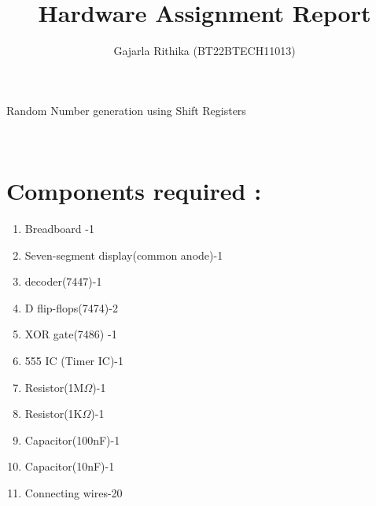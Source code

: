 \documentclass[12pt,onecolumn,notitlepage]{article}
\title{Hardware Assignment Report}
\author{Gajarla Rithika (BT22BTECH11013)}
\date{}
\begin{document}
\maketitle

\begin{LARGE}
{Random Number generation using Shift Registers}
\end{LARGE} \\

   \section*{Components required :}
\begin{enumerate}

  \setlength\itemsep{0pt} %
  \item  Breadboard -1   
\item Seven-segment display(common anode)-1
\item decoder(7447)-1
\item D flip-flops(7474)-2 
\item XOR gate(7486) -1   
\item 555 IC (Timer IC)-1
\item Resistor(1M$\Omega$)-1  
\item Resistor(1K$\Omega$)-1  
\item Capacitor(100nF)-1   
\item Capacitor(10nF)-1 
\item Connecting wires-20  
\end{enumerate} 
\end{document}
